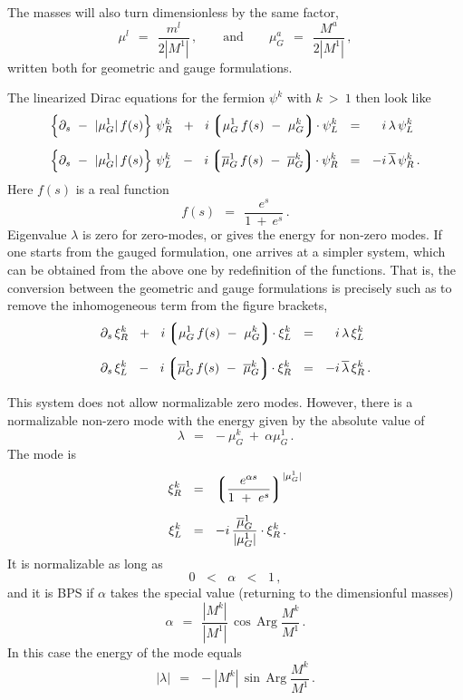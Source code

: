 \documentclass[epsfig,12pt]{article}
\def\beq{\begin{equation}}
\def\eeq{\end{equation}}
\def\beq{\begin{equation}}
\def\eeq{\end{equation}}
\newcommand{\p}{\partial}
\newcommand{\ov}{\overline}
\newcommand{\lgr}{\left\lgroup}
\newcommand{\rgr}{\right\rgroup}
\begin{document}
       The masses will also turn dimensionless by the same factor,
\beq
       \mu^l  ~~=~~ \frac{ m^l }
                        {2 |M^1|}\,,
	\qquad
	\text{and}
	\qquad
	\mu_G^a ~~=~~ \frac{ M^a }
                          {2 |M^1|}\,,
\eeq
       written both for geometric and gauge formulations.

       The linearized Dirac equations for the fermion $ \psi^k $ with $ k ~>~ 1 $ then look like
\begin{align}
%
\notag
       \Big\{ \p_s  ~-~ |\mu_G^1|\, f(s) \Big\}\,\, \psi_R^k   ~~+~~  i \lgr  \mu_G^1\, f(s)  ~-~  \mu_G^k \rgr\! \cdot \psi_L^k  
       & ~~=~~ \phantom{-} i\, \lambda\, \psi_L^k   \\[2mm]
%
       \Big\{ \p_s  ~-~ |\mu_G^1|\, f(s) \Big\}\,\, \psi_L^k   ~~-~~  i \lgr \ov{\mu}{}_G^1\, f(s)  ~-~ \ov{\mu}{}_G^k \rgr\! \cdot \psi_R^k 
       & ~~=~~ - i\, \ov{\lambda}\, \psi_R^k \,.
\end{align}
       Here $ f(s) $ is a real function
\beq
       f(s) ~~=~~ \frac{     e^s     }
                       { 1  ~+~  e^s }\,.
\eeq
       Eigenvalue $ \lambda $ is zero for zero-modes, or gives the energy for non-zero modes.
       If one starts from the gauged formulation, one arrives at a simpler system, which can be obtained from the
       above one by redefinition of the functions.
       That is, the conversion between the geometric and gauge formulations is precisely such as to remove the inhomogeneous term from the
       figure brackets,
\begin{align}
%
\notag
       \p_s\, \xi_R^k  ~~+~~  i \lgr \mu_G^1\, f(s) ~-~ \mu_G^k \rgr\! \cdot \xi_L^k  & ~~=~~ \phantom{-} i\, \lambda\, \xi_L^k \\[2mm]
%
       \p_s\, \xi_L^k  ~~-~~  i \lgr \ov{\mu}{}_G^1\, f(s) ~-~ \ov{\mu}{}_G^k \rgr\! \cdot \xi_R^k & ~~=~~ - i\, \ov{\lambda}\, \xi_R^k \,.
\end{align}
       
       This system does not allow normalizable zero modes.
       However, there is a normalizable non-zero mode with the energy given by the absolute value of 
\beq
       \lambda  ~~=~~  - \mu_G^k  ~+~ \alpha \mu_G^1\,.
\eeq
       The mode is
\begin{align}
%
\notag
       \xi_R^k  & ~~=~~  \lgr \frac{  e^{\alpha s}  }
                                   {   1 ~+~ e^s    }  \rgr^{ |\mu_G^1| }  \\[2mm]
%
       \xi_L^k  & ~~=~~  - i\, \frac{ \ov{\mu}{}_G^1 }
                                    {  | \mu_G^1 |   } \cdot \xi_R^k\,.
\end{align}
       It is normalizable as long as
\beq
       0  ~~\, < \,~~  \alpha  ~~\, < \,~~ 1\,,
\eeq
       and it is BPS if $ \alpha $ takes the special value (returning to the dimensionful masses)
\beq
       \alpha ~~=~~ \frac{|M^k|}
                         {|M^1|}\, \cos\, \text{Arg}\; \frac { M^k } 
                                                             { M^1 }\,.
\eeq
       In this case the energy of the mode equals
\beq
       | \lambda | ~~=~~ -  |M^k|\, \sin\, \text{Arg}\; \frac { M^k } 
                                                              { M^1 }\,.
\eeq
\end{document}
